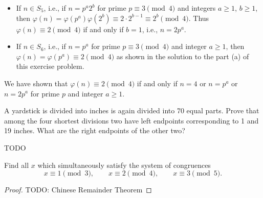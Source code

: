 \begin{solution}
\begin{itemize}
  \item
    If \( n \in S_5 \), i.e., if \( n = p^a 2^b \) for prime \( p
    \equiv 3 \pmod{4} \) and integers \( a \ge 1 \), \( b \ge 1 \),
    then \( \varphi(n) = \varphi(p^a) \varphi(2^b) \equiv 2 \cdot 2^{b
      - 1} \equiv 2^b \pmod{4} \). Thus \( \varphi(n) \equiv 2
    \pmod{4} \) if and only if \( b = 1 \), i.e., \( n = 2p^a \).
  \item
    If \( n \in S_6 \), i.e., if \( n = p^a \) for prime \( p \equiv 3
    \pmod{4} \) and integer \( a \ge 1 \), then \( \varphi(n) =
    \varphi(p^a) \equiv 2 \pmod{4} \) as shown in the solution to the
    part (a) of this exercise problem.
  \end{itemize}
  We have shown that \( \varphi(n) \equiv 2 \pmod{4} \) if and only if
  \( n = 4 \) or \( n = p^a \) or \( n = 2p^a \) for prime \( p \) and
  integer \( a \ge 1 \).
\end{solution}


\begin{exercise}{5.5}
  A yardstick is divided into inches is again divided into 70 equal
  parts. Prove that among the four shortest divisions two have left
  endpoints corresponding to 1 and 19 inches. What are the right
  endpoints of the other two?
\end{exercise}

\begin{solution}
  TODO
\end{solution}


\begin{exercise}{5.6}
  Find all \( x \) which simultaneously satisfy the system of congruences
  \[
    x \equiv 1 \pmod{3}, \qquad
    x \equiv 2 \pmod{4}, \qquad
    x \equiv 3 \pmod{5}.
  \]
\end{exercise}

\begin{proof}
  TODO: Chinese Remainder Theorem
\end{proof}



